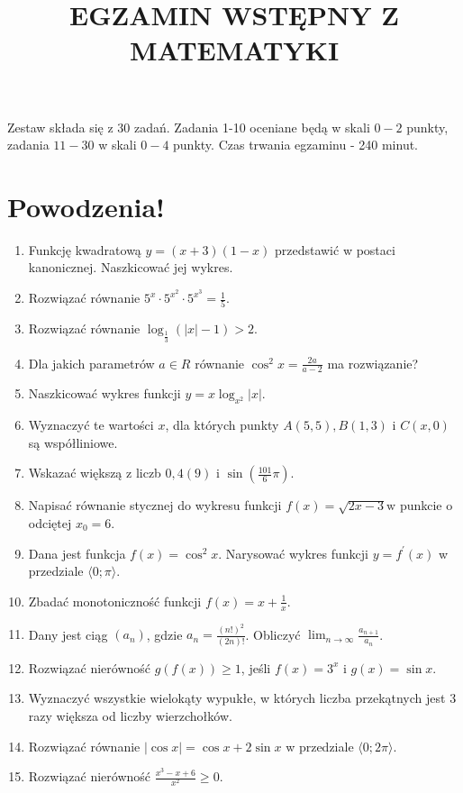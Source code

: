 \documentclass[10pt]{article}
\title{EGZAMIN WSTĘPNY Z MATEMATYKI }
\author{}
\date{}
\begin{document}
\maketitle
Zestaw składa się z 30 zadań. Zadania 1-10 oceniane będą w skali \(0-2\) punkty, zadania \(11-30\) w skali \(0-4\) punkty. Czas trwania egzaminu - 240 minut.

\section*{Powodzenia!}
\begin{enumerate}
  \item Funkcję kwadratową \(y=(x+3)(1-x)\) przedstawić w postaci kanonicznej. Naszkicować jej wykres.
  \item Rozwiązać równanie \(5^{x} \cdot 5^{x^{2}} \cdot 5^{x^{3}}=\frac{1}{5}\).
  \item Rozwiązać równanie \(\log _{\frac{1}{3}}(|x|-1)>2\).
  \item Dla jakich parametrów \(a \in R\) równanie \(\cos ^{2} x=\frac{2 a}{a-2}\) ma rozwiązanie?
  \item Naszkicować wykres funkcji \(y=x \log _{x^{2}}|x|\).
  \item Wyznaczyć te wartości \(x\), dla których punkty \(A(5,5), B(1,3)\) i \(C(x, 0)\) są współliniowe.
  \item Wskazać większą z liczb \(0,4(9)\) i \(\sin \left(\frac{101}{6} \pi\right)\).
  \item Napisać równanie stycznej do wykresu funkcji \(f(x)=\sqrt{2 x-3} \mathrm{w}\) punkcie o odciętej \(x_{0}=6\).
  \item Dana jest funkcja \(f(x)=\cos ^{2} x\). Narysować wykres funkcji \(y=f^{\prime}(x)\) w przedziale \(\langle 0 ; \pi\rangle\).
  \item Zbadać monotoniczność funkcji \(f(x)=x+\frac{1}{x}\).
  \item Dany jest ciąg \(\left(a_{n}\right)\), gdzie \(a_{n}=\frac{(n!)^{2}}{(2 n)!}\). Obliczyć \(\lim _{n \rightarrow \infty} \frac{a_{n+1}}{a_{n}}\).
  \item Rozwiązać nierówność \(g(f(x)) \geqslant 1\), jeśli \(f(x)=3^{x}\) i \(g(x)=\sin x\).
  \item Wyznaczyć wszystkie wielokąty wypukłe, w których liczba przekątnych jest 3 razy większa od liczby wierzchołków.
  \item Rozwiązać równanie \(|\cos x|=\cos x+2 \sin x\) w przedziale \(\langle 0 ; 2 \pi\rangle\).
  \item Rozwiązać nierówność \(\frac{x^{3}-x+6}{x^{2}} \geqslant 0\).

\end{enumerate}
\end{document}
